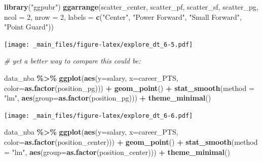 \documentclass[
]{book}
\newenvironment{Shaded}{\begin{snugshade}}{\end{snugshade}}
\newcommand{\AttributeTok}[1]{\textcolor[rgb]{0.13,0.29,0.53}{#1}}
\newcommand{\CommentTok}[1]{\textcolor[rgb]{0.56,0.35,0.01}{\textit{#1}}}
\newcommand{\DecValTok}[1]{\textcolor[rgb]{0.00,0.00,0.81}{#1}}
\newcommand{\FunctionTok}[1]{\textcolor[rgb]{0.13,0.29,0.53}{\textbf{#1}}}
\newcommand{\NormalTok}[1]{#1}
\newcommand{\SpecialCharTok}[1]{\textcolor[rgb]{0.81,0.36,0.00}{\textbf{#1}}}
\newcommand{\StringTok}[1]{\textcolor[rgb]{0.31,0.60,0.02}{#1}}
\begin{document}
\begin{Shaded}
\begin{Highlighting}[]
\FunctionTok{library}\NormalTok{(}\StringTok{"ggpubr"}\NormalTok{)}
\FunctionTok{ggarrange}\NormalTok{(scatter\_center, scatter\_pf,}
\NormalTok{          scatter\_sf, scatter\_pg,}
          \AttributeTok{ncol =} \DecValTok{2}\NormalTok{, }\AttributeTok{nrow =} \DecValTok{2}\NormalTok{,}
          \AttributeTok{labels =} \FunctionTok{c}\NormalTok{(}\StringTok{"Center"}\NormalTok{,}
                     \StringTok{"Power Forward"}\NormalTok{,}
                     \StringTok{"Small Forward"}\NormalTok{,}
                     \StringTok{"Point Guard"}\NormalTok{))}
\end{Highlighting}
\end{Shaded}

\texttt{[image: \_main\_files/figure-latex/explore\_dt\_6-5.pdf]}

\begin{Shaded}
\begin{Highlighting}[]
\CommentTok{\# yet a better way to compare this could be:}

\NormalTok{data\_nba }\SpecialCharTok{\%\textgreater{}\%} 
  \FunctionTok{ggplot}\NormalTok{(}\FunctionTok{aes}\NormalTok{(}\AttributeTok{y=}\NormalTok{salary, }\AttributeTok{x=}\NormalTok{career\_PTS, }\AttributeTok{color=}\FunctionTok{as.factor}\NormalTok{(position\_pg))) }\SpecialCharTok{+}
    \FunctionTok{geom\_point}\NormalTok{() }\SpecialCharTok{+} 
     \FunctionTok{stat\_smooth}\NormalTok{(}\AttributeTok{method =} \StringTok{"lm"}\NormalTok{,}
                 \FunctionTok{aes}\NormalTok{(}\AttributeTok{group=}\FunctionTok{as.factor}\NormalTok{(position\_pg))) }\SpecialCharTok{+} 
       \FunctionTok{theme\_minimal}\NormalTok{()}
\end{Highlighting}
\end{Shaded}

\texttt{[image: \_main\_files/figure-latex/explore\_dt\_6-6.pdf]}

\begin{Shaded}
\begin{Highlighting}[]
\NormalTok{data\_nba }\SpecialCharTok{\%\textgreater{}\%} 
  \FunctionTok{ggplot}\NormalTok{(}\FunctionTok{aes}\NormalTok{(}\AttributeTok{y=}\NormalTok{salary, }\AttributeTok{x=}\NormalTok{career\_PTS, }\AttributeTok{color=}\FunctionTok{as.factor}\NormalTok{(position\_center))) }\SpecialCharTok{+}
    \FunctionTok{geom\_point}\NormalTok{() }\SpecialCharTok{+} 
     \FunctionTok{stat\_smooth}\NormalTok{(}\AttributeTok{method =} \StringTok{"lm"}\NormalTok{,}
                 \FunctionTok{aes}\NormalTok{(}\AttributeTok{group=}\FunctionTok{as.factor}\NormalTok{(position\_center))) }\SpecialCharTok{+} 
       \FunctionTok{theme\_minimal}\NormalTok{()}
\end{Highlighting}
\end{Shaded}
\end{document}
